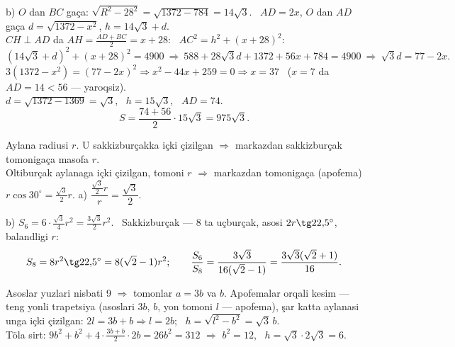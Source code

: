 b) $O$ dan $BC$ gaça: $\sqrt{R^2-28^2}=\sqrt{1372-784}=14\sqrt3$. \ $AD=2x$, $O$ dan $AD$ gaça $d=\sqrt{1372-x^2}$, $h=14\sqrt3+d$.\\
$CH\perp AD$ da $AH=\frac{AD+BC}2=x+28$: \ $AC^2=h^2+(x+28)^2$:
\[(14\sqrt3+d)^2+(x+28)^2=4900\ \Rightarrow\ 588+28\sqrt3d+1372+56x+784=4900\ \Rightarrow\ \sqrt3d=77-2x.\]
$3(1372-x^2)=(77-2x)^2\Rightarrow x^2-44x+259=0\Rightarrow x=37$ \ ($x=7$ da $AD=14<56$ — yaroqsiz).\\
$d=\sqrt{1372-1369}=\sqrt3$, \ $h=15\sqrt3$, \ $AD=74$.
\[S=\frac{74+56}2\cdot15\sqrt3=975\sqrt3.\]

\newpage
{}
Aylana radiusi $r$. U sakkizburçakka içki çizilgan $\Rightarrow$ markazdan sakkizburçak tomonigaça masofa $r$.\\
Oltiburçak aylanaga içki çizilgan, tomoni $r$ $\Rightarrow$ markazdan tomonigaça (apofema) $r\cos30^\circ=\frac{\sqrt3}2r$.
a) $\dfrac{\frac{\sqrt3}2r}r=\dfrac{\sqrt3}2$.

b) $S_6=6\cdot\frac{\sqrt3}4r^2=\frac{3\sqrt3}2r^2$. \ Sakkizburçak — 8 ta uçburçak, asosi $2r\tg22{,}5^\circ$, balandligi $r$:
\[S_8=8r^2\tg22{,}5^\circ=8(\sqrt2-1)r^2;\qquad \frac{S_6}{S_8}=\frac{3\sqrt3}{16(\sqrt2-1)}=\frac{3\sqrt3(\sqrt2+1)}{16}.\]

\newpage
{}
Asoslar yuzlari nisbati 9 $\Rightarrow$ tomonlar $a=3b$ va $b$. Apofemalar orqali kesim — teng yonli trapetsiya (asoslari $3b$, $b$, yon tomoni $l$ — apofema), şar katta aylanasi unga içki çizilgan:
$2l=3b+b\Rightarrow l=2b$; \ $h=\sqrt{l^2-b^2}=\sqrt3\,b$.\\
Töla sirt: $9b^2+b^2+4\cdot\frac{3b+b}2\cdot2b=26b^2=312$ $\Rightarrow$ $b^2=12$, \ $h=\sqrt3\cdot2\sqrt3=6$.

